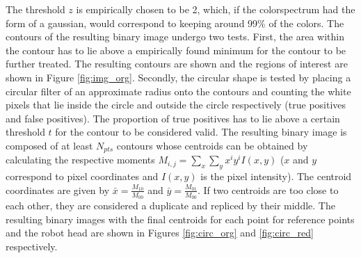 The threshold $z$ is empirically chosen to be 2, which, if the colorspectrum had the form of a gaussian, would correspond to keeping around 99\% of the colors.
The contours of the resulting binary image undergo two tests. 
First, the area within the contour has to lie above a empirically found minimum for the contour to be further treated. The resulting contours are shown and the regions of interest are shown in Figure \ref{fig:img_org}. 
Secondly, the circular shape is tested by placing a circular filter of an approximate radius onto the contours and counting the white pixels that lie inside the circle and outside the circle respectively (true positives and false positives). 
The proportion of true positives has to lie above a certain threshold $t$ for the contour to be considered valid.  
The resulting binary image is composed of at least $N_{pts}$ contours whose centroids can be obtained by calculating the respective moments $M_{i,j}=\sum_{x} \sum_{y} x^iy^i I(x,y)$ ($x$ and $y$ correspond to pixel coordinates and $I(x,y)$ is the pixel intensity). 
The centroid coordinates are given by $\bar{x}=\frac{M_{10}}{M_{00}}$ and $\bar{y}=\frac{M_{01}}{M_{00}}$. If two centroids are too close to each other, they are considered a duplicate and repliced by their middle.
The resulting binary images with the final centroids for each point for reference points and the robot head are shown in Figures \ref{fig:circ_org} and \ref{fig:circ_red} respectively.
